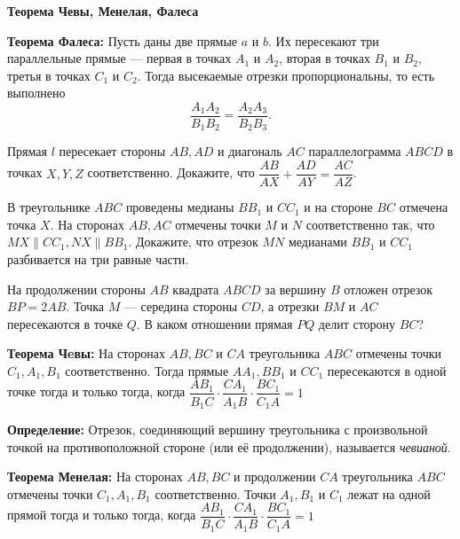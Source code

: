 \documentclass{article}
\begin{document}
    \large


    \begin{center}
        \textbf{Теорема Чевы, Менелая, Фалеса}
    \end{center}


    \textbf{Теорема Фалеса:} Пусть даны две прямые  $a$ и $b$.
    Их пересекают три параллельные прямые — первая в точках $A_1$ и $A_2$, вторая в точках $B_1$ и $B_2$, третья в точках $C_1$ и $C_2$.
    Тогда высекаемые отрезки пропорциональны, то есть выполнено
    \[\frac{A_{1}A_2}{B_{1}B_2} =\frac{A_{2}A_3}{B_{2}B_3}.\]
    \begin{enumerate_boxed}

        \item Прямая $l$ пересекает стороны $AB, AD$ и диагональ $AC$ параллелограмма $ABCD$ в точках $X, Y, Z$ соответственно.
        Докажите, что $\dfrac{AB}{AX} + \dfrac{AD}{AY} = \dfrac{AC}{AZ}$.

        \item В треугольнике $ABC$ проведены медианы $BB_1$ и $CC_1$ и на стороне $BC$ отмечена точка $X$.
        На сторонах $AB, AC$ отмечены точки $M$ и $N$ соответственно так, что $MX \parallel CC_1, NX \parallel BB_1$.
        Докажите, что отрезок $MN$ медианами $BB_1$ и $CC_1$ разбивается на три равные части.

        \item На продолжении стороны $AB$ квадрата $ABCD$ за вершину $B$ отложен отрезок $BP = 2AB$.
        Точка $M$ — середина стороны $CD$, а отрезки $BM$ и $AC$ пересекаются в точке $Q$.
        В каком отношении прямая $PQ$ делит сторону $BC$?
    \end{enumerate_boxed}


    \textbf{Теорема Чeвы:} На сторонах $AB, BC$ и $CA$ треугольника $ABC$ отмечены точки $C_1, A_1, B_1$ соответственно.
    Тогда прямые $AA_1, BB_1$ и $CC_1$ пересекаются в одной точке тогда и только тогда, когда
    $\dfrac{AB_1}{B_{1}C}\cdot \dfrac{CA_1}{A_{1}B} \cdot\dfrac{BC_1}{C_{1}A} = 1$

    \textbf{Определение:} Отрезок, соединяющий вершину треугольника с произвольной точкой на противоположной стороне (или её продолжении), называется \textit{чевианой}.

    \textbf{Теорема Менелая:} На сторонах $AB, BC$ и продолжении $CA$ треугольника $ABC$ отмечены точки $C_1, A_1, B_1$ соответственно.
    Точки $A_1, B_1$ и $C_1$ лежат на одной прямой тогда и только тогда, когда
    $\dfrac{AB_1}{B_{1}C}\cdot \dfrac{CA_1}{A_{1}B} \cdot\dfrac{BC_1}{C_{1}A} = 1$
\end{document}
